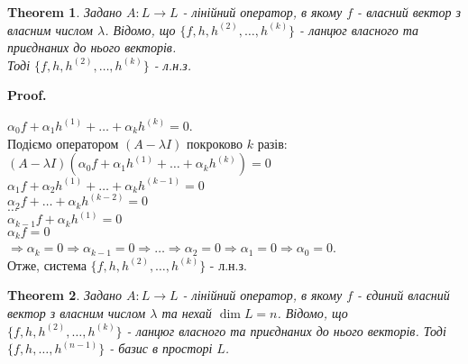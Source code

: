 \documentclass[a4paper, 10pt]{article}
\makeatletter
\theoremstyle{theoremdd}
\newtheorem{theorem}{Theorem}[subsection]
\renewenvironment{proof}[1][Proof.\\]{\par
\pushQED{\hfill \qed}%
\normalfont \topsep6\p@\@plus6\p@\relax
\trivlist
\item\relax
{\bfseries
#1\@addpunct{.}}\hspace\labelsep\ignorespaces
}{%
\popQED\endtrivlist\@endpefalse
}
\makeatother
\begin{document}
\begin{theorem}
Задано $A: L \to L$ - лінійний оператор, в якому $f$ - власний вектор з власним числом $\lambda$. Відомо, що $\{f,h,h^{(2)},\dots,h^{(k)}\}$ - ланцюг власного та приєднаних до нього векторів.\\
Тоді $\{f,h,h^{(2)},\dots,h^{(k)}\}$ - л.н.з.
\end{theorem}

\begin{proof}
$\alpha_0 f + \alpha_1 h^{(1)} + \dots + \alpha_k h^{(k)} = 0$.\\
Подіємо оператором $(A-\lambda I)$ покроково $k$ разів:\\
$(A-\lambda I)(\alpha_0 f + \alpha_1 h^{(1)} + \dots + \alpha_k h^{(k)}) = 0$\\
$\alpha_1 f + \alpha_2 h^{(1)} + \dots + \alpha_k h^{(k-1)} = 0$\\
$\alpha_2 f + \dots + \alpha_k h^{(k-2)} = 0$\\
$\dots$\\
$\alpha_{k-1} f + \alpha_k h^{(1)} = 0$\\
$\alpha_k f = 0$\\
$\Rightarrow \alpha_k = 0 \Rightarrow \alpha_{k-1} = 0 \Rightarrow \dots \Rightarrow \alpha_2 = 0 \Rightarrow \alpha_1 = 0 \Rightarrow \alpha_0 = 0$.\\
Отже, система $\{f,h,h^{(2)},\dots,h^{(k)}\}$ - л.н.з.
\end{proof}

\begin{theorem}
Задано $A: L \to L$ - лінійний оператор, в якому $f$ - єдиний власний вектор з власним числом $\lambda$ та нехай $\dim L = n$. Відомо, що $\{f,h,h^{(2)},\dots,h^{(k)}\}$ - ланцюг власного та приєднаних до нього векторів.
Тоді $\{f,h,\dots,h^{(n-1)}\}$ - базис в просторі $L$.
\end{theorem}
\end{document}
